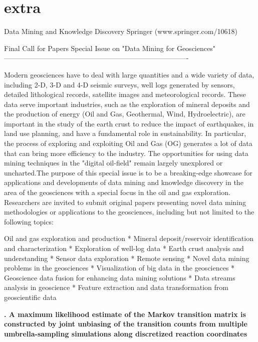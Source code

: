 
\section{extra}
Data Mining and Knowledge Discovery
Springer (www.springer.com/10618)

Final Call for Papers
Special Issue on "Data Mining for Geosciences"
-------------------------------------------------------------------------------

Modern geosciences have to deal with large quantities and a wide variety of data, including 2-D, 3-D and 4-D seismic surveys, well logs generated by sensors, detailed lithological records, satellite images and meteorological records. These data serve important industries, such as the exploration of mineral deposits and the production of energy (Oil and Gas, Geothermal, Wind, Hydroelectric), are important in the study of the earth crust to reduce the impact of earthquakes, in land use planning, and have a fundamental role in sustainability. In particular, the process of exploring and exploiting Oil and Gas (OG) generates a lot of data that can bring more efficiency to the industry. The opportunities for using data mining techniques in the "digital oil-field" remain largely unexplored or uncharted.The purpose of this special issue is to be a breaking-edge showcase for applications and developments of data mining and knowledge discovery in the area of the geosciences with a special focus in the oil and gas exploration. Researchers are invited to submit original papers presenting novel data mining methodologies or applications to the geosciences, including but not limited to the following topics:

\* Oil and gas exploration and production
* Mineral deposit/reservoir identification and characterization
* Exploration of well-log data
* Earth crust analysis and understanding
* Sensor data exploration
* Remote sensing
* Novel data mining problems in the geosciences
* Visualization of big data in the geosciences
* Geoscience data fusion for enhancing data mining solutions
* Data streams analysis in geoscience
* Feature extraction and data transformation from geoscientific data



\textbf{
. A maximum likelihood estimate of the Markov transition matrix is constructed by joint unbiasing of the transition counts from multiple umbrella-sampling simulations along discretized reaction coordinates}
